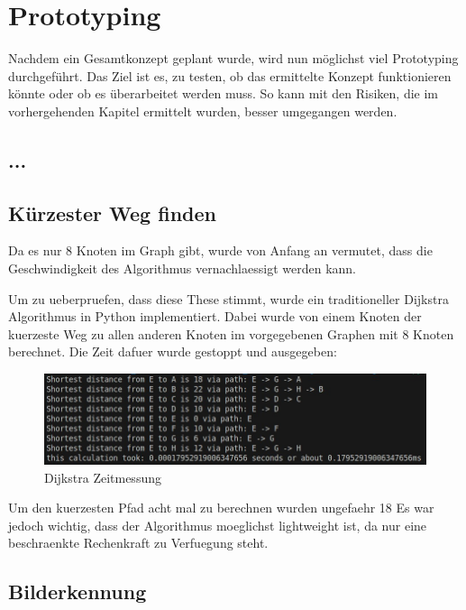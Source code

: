 \section{Prototyping}

Nachdem ein Gesamtkonzept geplant wurde, wird nun möglichst viel Prototyping durchgeführt. Das Ziel ist es, zu testen, ob das ermittelte Konzept funktionieren könnte oder ob es überarbeitet werden muss. So kann mit den Risiken, die im vorhergehenden Kapitel ermittelt wurden, besser umgegangen werden.

\subsection{...}

\subsection{Kürzester Weg finden}

Da es nur 8 Knoten im Graph gibt, wurde von Anfang an vermutet, dass die Geschwindigkeit des Algorithmus vernachlaessigt werden kann.

Um zu ueberpruefen, dass diese These stimmt, wurde ein traditioneller Dijkstra Algorithmus in Python implementiert. Dabei wurde von einem Knoten der kuerzeste Weg zu allen anderen Knoten im vorgegebenen Graphen mit 8 Knoten berechnet. Die Zeit dafuer wurde gestoppt und ausgegeben:

\begin{figure}[H]
\centering
\includegraphics[width=\textwidth -30mm]{assets/informatik-prototyp/dijkstra-time.jpeg}
\caption{Dijkstra Zeitmessung}
\label{fig:dijkstra-time}
\end{figure}

Um den kuerzesten Pfad acht mal zu berechnen wurden ungefaehr 18 
 Es war jedoch wichtig, dass der Algorithmus moeglichst lightweight ist, da nur eine beschraenkte Rechenkraft zu Verfuegung steht.


\subsection{Bilderkennung}

